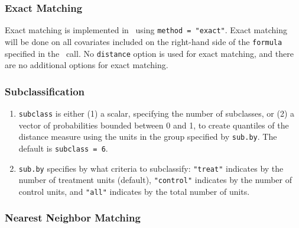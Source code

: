 \subsubsection{Exact Matching}
\label{subsubsec:inputs-exact}

Exact matching is implemented in \MatchIt\ using \texttt{method =
  "exact"}.  Exact matching will be done on all covariates included on
the right-hand side of the \texttt{formula} specified in the \MatchIt\
call.  No \texttt{distance} option is used for exact matching, and
there are no additional options for exact matching.

\subsubsection{Subclassification}
\label{subsubsec:inputs-subclass}

\begin{enumerate}
\item \texttt{subclass} is either (1) a scalar, specifying the number
  of subclasses, or (2) a vector of probabilities bounded between 0
  and 1, to create quantiles of the distance measure using the units
  in the group specified by \texttt{sub.by}.  The default is
  \texttt{subclass = 6}.
\item \texttt{sub.by} specifies by what criteria to subclassify:
  \texttt{"treat"} indicates by the number of treatment units
  (default), \texttt{"control"} indicates by the number of control
  units, and \texttt{"all"} indicates by the total number of units.
\end{enumerate}

\subsubsection{Nearest Neighbor Matching}
\label{subsubsec:inputs-nearest}

